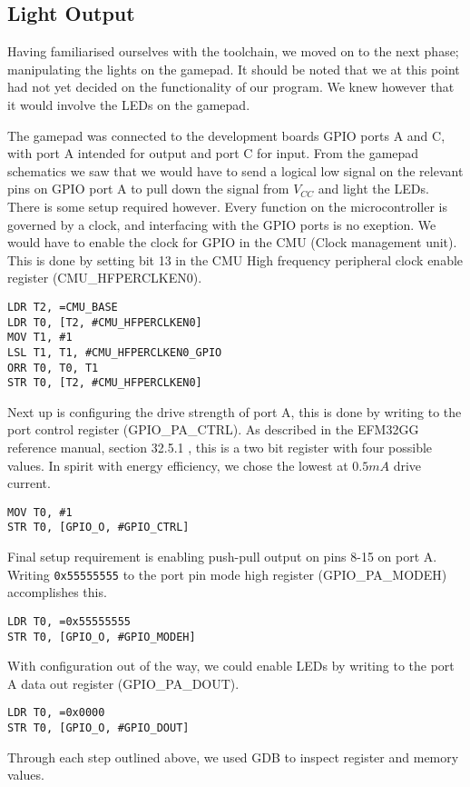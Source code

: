 \subsection{Light Output}
\label{sec:light-output}

Having familiarised ourselves with the toolchain, we moved on to the next phase; manipulating the lights on the gamepad. It should be noted that we at this point had not yet decided on the functionality of our program. We knew however that it would involve the LEDs on the gamepad.

The gamepad was connected to the development boards GPIO ports A and C, with port A intended for output and port C for input. From the gamepad schematics \cite[p.~26]{compendium} we saw that we would have to send a logical low signal on the relevant pins on GPIO port A to pull down the signal from $V_{CC}$ and light the LEDs. There is some setup required however. Every function on the microcontroller is governed by a clock, and interfacing with the GPIO ports is no exeption. We would have to enable the clock for GPIO in the CMU (Clock management unit). This is done by setting bit 13 in the CMU High frequency peripheral clock enable register (CMU\_HFPERCLKEN0).

\begin{lstlisting}[label=enable-gpio-clock,caption=Enabling GPIO clock in the CMU]
LDR T2, =CMU_BASE
LDR T0, [T2, #CMU_HFPERCLKEN0]
MOV T1, #1
LSL T1, T1, #CMU_HFPERCLKEN0_GPIO
ORR T0, T0, T1
STR T0, [T2, #CMU_HFPERCLKEN0]
\end{lstlisting}

Next up is configuring the drive strength of port A, this is done by writing to the port control register (GPIO\_PA\_CTRL). As described in the EFM32GG reference manual, section 32.5.1 \cite{efm32ggref}, this is a two bit register with four possible values. In spirit with energy efficiency, we chose the lowest at $0.5mA$ drive current.

\begin{lstlisting}[label=set-drive-strength, caption=Set drive strength]
MOV T0, #1
STR T0, [GPIO_O, #GPIO_CTRL]
\end{lstlisting}

Final setup requirement is enabling push-pull output on pins 8-15 on port A. Writing \texttt{0x55555555} to the port pin mode high register (GPIO\_PA\_MODEH) accomplishes this. \cite[p.~767]{efm32ggref}

\begin{lstlisting}[label=enable-gpio-output, caption=Enable output]
LDR T0, =0x55555555
STR T0, [GPIO_O, #GPIO_MODEH]
\end{lstlisting}

With configuration out of the way, we could enable LEDs by writing to the port A data out register (GPIO\_PA\_DOUT).

\begin{lstlisting}[label=enable-leds, caption=Enabling LEDs]
LDR T0, =0x0000
STR T0, [GPIO_O, #GPIO_DOUT]
\end{lstlisting}

Through each step outlined above, we used GDB to inspect register and memory values. 
